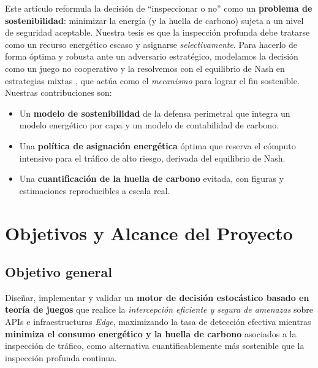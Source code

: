 \documentclass[10pt,twocolumn]{article}
\begin{document}
Este art\'iculo reformula la decisi\'on de ``inspeccionar o no'' como un
\textbf{problema de sostenibilidad}: minimizar la energ\'ia (y la huella de carbono)
sujeta a un nivel de seguridad aceptable. Nuestra tesis es que la inspecci\'on
profunda debe tratarse como un recurso energ\'etico escaso y asignarse
\emph{selectivamente}. Para hacerlo de forma \'optima y robusta ante un adversario
estrat\'egico, modelamos la decisi\'on como un juego no cooperativo y la resolvemos
con el equilibrio de Nash en estrategias mixtas \cite{alpcan,manshaei}, que act\'ua
como el \emph{mecanismo} para lograr el fin sostenible. Nuestras contribuciones son:
\begin{itemize}\itemsep2pt
  \item Un \textbf{modelo de sostenibilidad} de la defensa perimetral que integra un
        modelo energ\'etico por capa y un modelo de contabilidad de carbono.
  \item Una \textbf{pol\'itica de asignaci\'on energ\'etica} \'optima que reserva el
        c\'omputo intensivo para el tr\'afico de alto riesgo, derivada del equilibrio
        de Nash.
  \item Una \textbf{cuantificaci\'on de la huella de carbono} evitada, con figuras y
        estimaciones reproducibles a escala real.
\end{itemize}

\section{Objetivos y Alcance del Proyecto}
\label{sec:objetivos}

\subsection{Objetivo general}
Dise\~nar, implementar y validar un \textbf{motor de decisi\'on estoc\'astico basado
en teor\'ia de juegos} que realice la \emph{intercepci\'on eficiente y segura de
amenazas} sobre APIs e infraestructuras \emph{Edge}, maximizando la tasa de
detecci\'on efectiva mientras \textbf{minimiza el consumo energ\'etico y la huella de
carbono} asociados a la inspecci\'on de tr\'afico, como alternativa cuantificablemente
m\'as sostenible que la inspecci\'on profunda continua.
\end{document}
